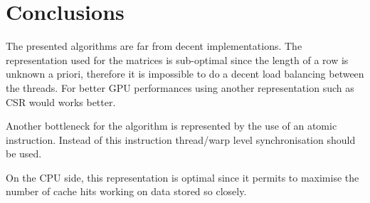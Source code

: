 \documentclass[conference]{IEEEtran}
\begin{document}
\section{Conclusions}
The presented algorithms are far from decent implementations. The representation used for the matrices is sub-optimal since the length of a row is unknown a priori, therefore it is impossible to do a decent load balancing between the threads. For better GPU performances using another representation such as CSR would works better.

Another bottleneck for the algorithm is represented by the use of an atomic instruction. Instead of this instruction thread/warp level synchronisation should be used.

On the CPU side, this representation is optimal since it permits to maximise the number of cache hits working on data stored so closely.



\end{document}
